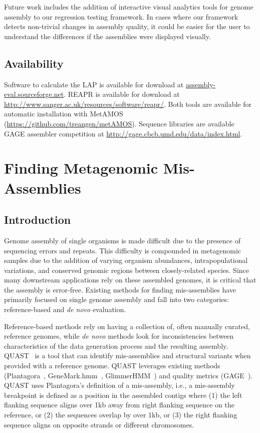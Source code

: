 \documentclass[12pt,\mydriver]{thesis}
\providecommand{\DIFaddtex}[1]{{\protect\color{blue}\uwave{#1}}} %
\providecommand{\DIFaddbegin}{} %
\providecommand{\DIFaddend}{} %
\providecommand{\DIFadd}[1]{\texorpdfstring{\DIFaddtex{#1}}{#1}} %
\begin{document}
Future work includes the addition of interactive visual analytics tools for genome assembly to our regression testing framework.
In cases where our framework detects non-trivial changes in assembly quality, it could be easier for the user to understand the differences if the assemblies were displayed visually.


\section{Availability}
Software to calculate the LAP is available for download at \url{assembly-eval.sourceforge.net}.
REAPR is available for download at \url{http://www.sanger.ac.uk/resources/software/reapr/}.
Both tools are available for automatic installation with MetAMOS (\url{https://github.com/treangen/metAMOS}).
Sequence libraries are available GAGE assembler competition at \url{http://gage.cbcb.umd.edu/data/index.html}.
\clearpage{}
\clearpage{}\renewcommand{\thechapter}{5}

\chapter{Finding Metagenomic Mis-Assemblies}

\section{Introduction}

Genome assembly of single organisms is made difficult due to the presence of sequencing errors and repeats.
This difficulty is compounded in metagenomic samples due to the addition of varying organism abundances, intrapopulational variations, and conserved genomic regions between closely-related species.
Since many downstream applications rely on these assembled genomes, it is critical that the assembly is error-free.
Existing methods for finding mis-assemblies have primarily focused on single genome assembly and fall into two categories: reference-based and \emph{de novo} evaluation.

Reference-based methods rely on having a collection of, often manually curated, reference genomes, while \emph{de novo} methods look for inconsistencies between characteristics of the data generation process and the resulting assembly.
QUAST~\cite{gurevich2013quast} is a tool that can identify mis-assemblies and structural variants when provided with a reference genome.
QUAST leverages existing methods (Plantagora~\cite{barthelson2011plantagora},
GeneMark.hmm~\cite{lukashin1998genemark}, GlimmerHMM~\cite{majoros2004tigrscan}) and quality metrics (GAGE~\cite{salzberg2011gage}).
QUAST uses \DIFaddbegin \DIFadd{the }\DIFaddend Plantagora’s definition of a mis-assembly,
i.e., a mis-assembly breakpoint is defined as a position in the assembled contigs where (1) the left flanking
sequence aligns over 1kb away from right flanking sequence on the reference, or (2) the sequences overlap by
over 1kb, or (3) the right flanking sequence aligns on opposite strands or different chromosomes.
\end{document}

